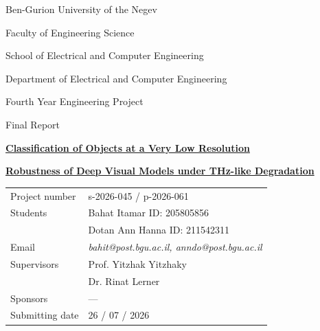\begin{titlepage}
\centering
\vspace*{1.5cm}

{\Large Ben-Gurion University of the Negev}\par
\vspace{0.3cm}
{\large Faculty of Engineering Science}\par
\vspace{0.2cm}
{\large School of Electrical and Computer Engineering}\par
\vspace{0.2cm}
{\large Department of Electrical and Computer Engineering}\par
\vspace{2.5cm}

{\large Fourth Year Engineering Project}\par
\vspace{0.4cm}
{\large Final Report}\par
\vspace{1.0cm}

{\Large\bfseries\underline{Classification of Objects at a Very Low Resolution}}\par
\vspace{0.3cm}
{\large\bfseries\underline{Robustness of Deep Visual Models under THz-like Degradation}}\par

\vspace{2.0cm}
\begin{tabular}{ll}
Project number   & s-2026-045 / p-2026-061 \\[0.6em]
Students         & Bahat Itamar \quad ID: 205805856 \\
                 & Dotan Ann Hanna \quad ID: 211542311 \\[0.6em]
Email            & \textit{bahit@post.bgu.ac.il, anndo@post.bgu.ac.il} \\[0.6em]
Supervisors      & Prof. Yitzhak Yitzhaky \\
                 & Dr. Rinat Lerner \\[0.6em]
Sponsors         & --- \\[0.6em]
Submitting date  & 26 / 07 / 2026 \\
\end{tabular}

\vfill
\end{titlepage}
